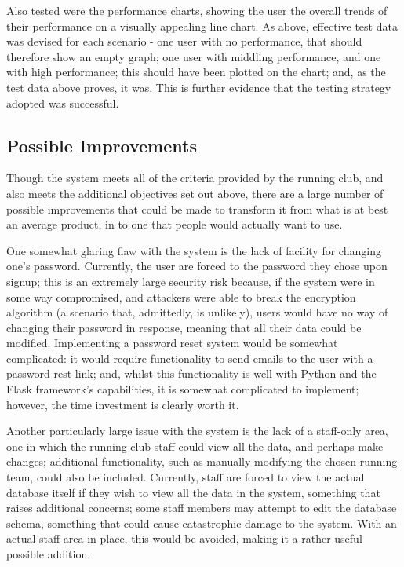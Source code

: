 \documentclass{article}[12pt,a4paper]
\begin{document}
{Also tested were the performance charts, showing the user the overall trends of their performance on a visually appealing line chart. As above, effective test data was devised for each scenario - one user with no performance, that should therefore show an empty graph; one user with middling performance, and one with high performance; this should have been plotted on the chart; and, as the test data above proves, it was. This is further evidence that the testing strategy adopted was successful.

\subsection{Possible Improvements}
Though the system meets all of the criteria provided by the running club, and also meets the additional objectives set out above, there are a large number of possible improvements that could be made to transform it from what is at best an average product, in to one that people would actually want to use.

One somewhat glaring flaw with the system is the lack of facility for changing one's password. Currently, the user are forced to the password they chose upon signup; this is an extremely large security risk because, if the system were in some way compromised, and attackers were able to break the encryption algorithm (a scenario that, admittedly, is unlikely), users would have no way of changing their password in response, meaning that all their data could be modified. Implementing a password reset system would be somewhat complicated: it would require functionality to send emails to the user with a password rest link; and, whilst this functionality is well with Python and the Flask framework's capabilities, it is somewhat complicated to implement; however, the time investment is clearly worth it.

Another particularly large issue with the system is the lack of a staff-only area, one in which the running club staff could view all the data, and perhaps make changes; additional functionality, such as manually modifying the chosen running team, could also be included. Currently, staff are forced to view the actual database itself if they wish to view all the data in the system, something that raises additional concerns; some staff members may attempt to edit the database schema, something that could cause catastrophic damage to the system. With an actual staff area in place, this would be avoided, making it a rather useful possible addition.

}
\end{document}
